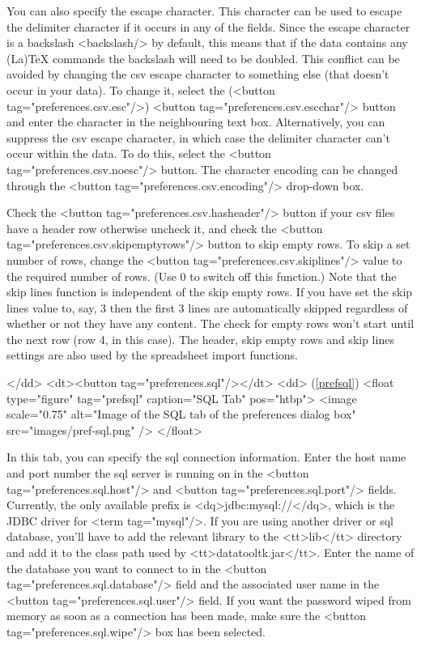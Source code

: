      You can also specify the escape character. This character can be used to 
     escape the delimiter character if it occurs in any of the fields. Since the
     escape character is a backslash <backslash/> by default, this means
     that if the data contains any (La)TeX commands the backslash will need
     to be doubled. This conflict can be avoided by changing the 
     \gls{csv} escape character to something else (that doesn't occur 
     in your data). To change it, select the (<button tag="preferences.csv.esc"/>) 
     <button tag="preferences.csv.escchar"/> button and enter the
     character in the neighbouring text box. Alternatively, you can suppress the \gls{csv}
     escape character, in which case the delimiter character can't occur within 
     the data. To do this, select the <button tag="preferences.csv.noesc"/>
     button.  The character encoding can be changed through the 
     <button tag="preferences.csv.encoding"/> drop-down box.

Check the
     <button tag="preferences.csv.hasheader"/> button if your 
     \gls{csv} files have a header row otherwise uncheck it, and
     check the  <button tag="preferences.csv.skipemptyrows"/> button
     to skip empty rows. To skip a set number of rows, change the
     <button tag="preferences.csv.skiplines"/> value to the required number 
     of rows. (Use 0 to switch off this function.) Note that the skip lines
     function is independent of the skip empty rows. If you have set the 
     skip lines value to, say, 3 then the first 3 lines are automatically 
     skipped regardless of whether or not they have any content. The check for 
     empty rows won't start until the next row (row 4, in this case).
     The header, skip empty rows and skip lines settings are also used by
     the spreadsheet import functions.

    </dd>
    <dt><button tag="preferences.sql"/></dt>
    <dd>
     (\autoref{prefsql})
     <float type="figure" tag="prefsql" caption="SQL Tab" pos="htbp">
      <image scale="0.75" alt="Image of the SQL tab of the preferences dialog box" src="images/pref-sql.png" />
     </float>

    In this tab, you can specify the \gls{sql} connection information.
    Enter the host name and port number the \gls{sql} server is 
    running on in the <button tag="preferences.sql.host"/> and 
    <button tag="preferences.sql.port"/> fields. Currently, the only
    available prefix is <dq>jdbc:mysql://</dq>, which is the JDBC driver for
    <term tag="mysql"/>. If you are using another driver or \gls{sql} 
    database, you'll have to add the relevant library to the <tt>lib</tt>
    directory and add it to the class path used by <tt>datatooltk.jar</tt>.
    Enter the name of the database you want to connect to in the 
    <button tag="preferences.sql.database"/> field and the associated
    user name in the <button tag="preferences.sql.user"/> field.
    If you want the password wiped from memory as soon as a connection
    has been made, make sure the <button tag="preferences.sql.wipe"/>
    box has been selected.

